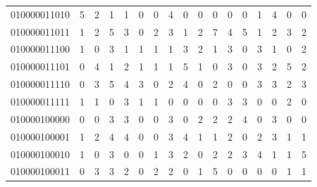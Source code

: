 \documentclass[10pt,a4paper]{article}
\begin{document}
\begin{longtable}{ |c|c|c|c|c|c|c|c|c|c|c|c|c|c|c|c|c| }
    010000011010              & 5                            & 2                                & 1                            & 1                              & 0   & 0   & 4   & 0   & 0   & 0   & 0   & 0   & 1   & 4   & 0   & 0   \\
    010000011011              & 1                            & 2                                & 5                            & 3                              & 0   & 2   & 3   & 1   & 2   & 7   & 4   & 5   & 1   & 2   & 3   & 2   \\
    010000011100              & 1                            & 0                                & 3                            & 1                              & 1   & 1   & 1   & 3   & 2   & 1   & 3   & 0   & 3   & 1   & 0   & 2   \\
    010000011101              & 0                            & 4                                & 1                            & 2                              & 1   & 1   & 1   & 5   & 1   & 0   & 3   & 0   & 3   & 2   & 5   & 2   \\
    010000011110              & 0                            & 3                                & 5                            & 4                              & 3   & 0   & 2   & 4   & 0   & 2   & 0   & 0   & 3   & 3   & 2   & 3   \\
    010000011111              & 1                            & 1                                & 0                            & 3                              & 1   & 1   & 0   & 0   & 0   & 0   & 3   & 3   & 0   & 0   & 2   & 0   \\
    010000100000              & 0                            & 0                                & 3                            & 3                              & 0   & 0   & 3   & 0   & 2   & 2   & 2   & 4   & 0   & 3   & 0   & 0   \\
    010000100001              & 1                            & 2                                & 4                            & 4                              & 0   & 0   & 3   & 4   & 1   & 1   & 2   & 0   & 2   & 3   & 1   & 1   \\
    010000100010              & 1                            & 0                                & 3                            & 0                              & 0   & 1   & 3   & 2   & 0   & 2   & 2   & 3   & 4   & 1   & 1   & 5   \\
    010000100011              & 0                            & 3                                & 3                            & 2                              & 0   & 2   & 2   & 0   & 1   & 5   & 0   & 0   & 0   & 0   & 1   & 1   \\

\end{longtable}
\end{document}
